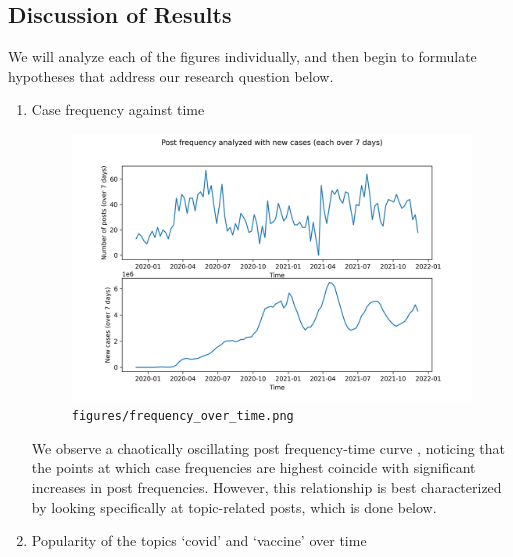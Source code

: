 \documentclass[fontsize=11pt]{article}
\begin{document}
\subsection{Discussion of Results}

We will analyze each of the figures individually, and then begin to formulate hypotheses that address our research question below.

\begin{enumerate}
    \item Case frequency against time
    
    \begin{figure}[H]
        \centering
        \includegraphics[width=14cm]{figures/frequency_over_time.png}
        \caption{\texttt{figures/frequency\_over\_time.png}}
        
    \end{figure}
    
    We observe a chaotically oscillating post frequency-time curve , noticing that the points at which case frequencies are highest coincide with significant increases in post frequencies. However, this relationship is best characterized by looking specifically at topic-related posts, which is done below.
    
    \item Popularity of the topics `covid' and `vaccine' over time
    

\end{enumerate}
\end{document}
